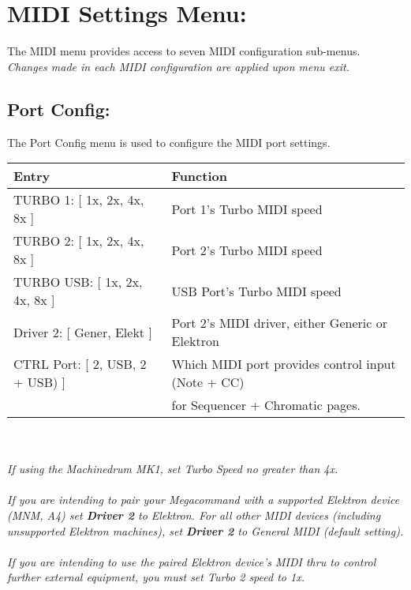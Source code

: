 \chapter{MIDI Settings Menu:}
The MIDI menu provides access to seven MIDI configuration sub-menus.
\\
\textit{Changes made in each MIDI configuration are applied upon menu exit.}

\section{Port Config:}
The Port Config menu is used to configure the MIDI port settings.
\\
\begin{tabular}{|l|l|}
\hline
\rowcolor[HTML]{C0C0C0} 
Entry                                  & Function                                                                       \\ \hline
TURBO 1: {[} 1x, 2x, 4x, 8x {]}        & Port 1's Turbo MIDI speed                                                             \\ \hline
TURBO 2: {[} 1x, 2x, 4x, 8x {]}        & Port 2's Turbo MIDI speed                                                             \\ \hline
TURBO USB: {[} 1x, 2x, 4x, 8x {]}      & USB Port's Turbo MIDI speed                                                           \\ \hline
Driver 2: {[} Gener, Elekt {]}         &  Port 2's MIDI driver, either Generic or Elektron                                   \\ \hline
CTRL Port: {[} 2, USB, 2 + USB) {]}    & Which MIDI port provides control input (Note + CC)\\& for Sequencer + Chromatic pages.  \\ \hline                                    
\end{tabular}
\\\\
\textit{If using the Machinedrum MK1, set Turbo Speed no greater than 4x.}\\\\
\textit{{If you are intending to pair your Megacommand with a supported Elektron device}
(MNM, A4) set \textbf{Driver 2}  to Elektron. For all other MIDI devices (including unsupported Elektron machines), set \textbf{Driver 2} to General MIDI (default setting).}\\\\
\textit{If you are intending to use the paired Elektron device's MIDI thru to control further external equipment, you must set Turbo 2 speed to 1x.}

